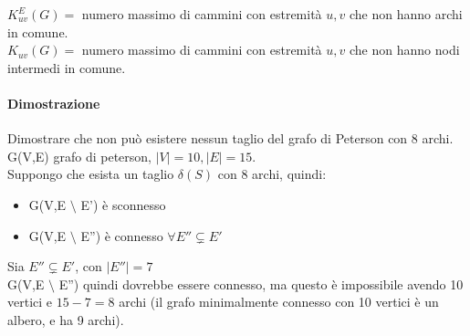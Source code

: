 \(K^E_{uv} (G) =\) numero massimo di cammini con estremità $u,v$ che non hanno archi in comune. \\
\(K_{uv} (G) =\) numero massimo di cammini con estremità $u,v$ che non hanno nodi intermedi in comune. \\

\paragraph{Dimostrazione} Dimostrare che non può esistere nessun taglio del grafo di Peterson con 8 archi. \\
G(V,E) grafo di peterson, \(\mid V \mid = 10 , \mid E \mid = 15\). \\
Suppongo che esista un taglio $\delta(S)$ con 8 archi, quindi:
\begin{itemize}
\item G(V,E $\setminus$ E') è sconnesso
\item G(V,E $\setminus$ E'') è connesso \( \forall E'' \subsetneq E'\)
\end{itemize}
Sia $E'' \subsetneq E'$, con $\mid E'' \mid = 7$ \\
G(V,E $\setminus$ E'') quindi dovrebbe essere connesso, ma questo è impossibile avendo 10 vertici e $15-7=8$ archi (il grafo minimalmente connesso con 10 vertici è un albero, e ha 9 archi).

\newpage
